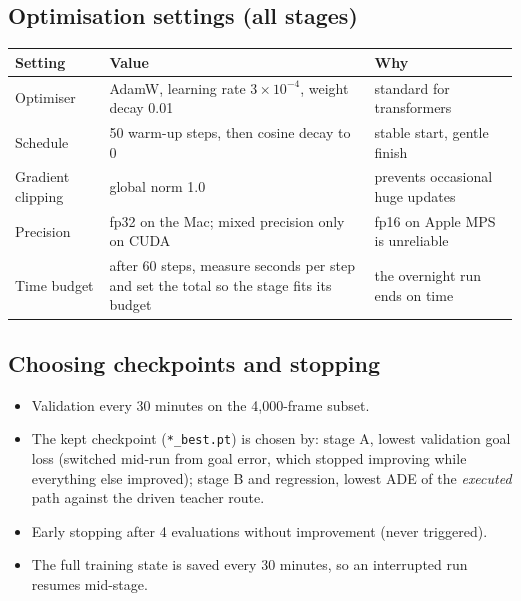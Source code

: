 \documentclass[11pt,a4paper]{article}
\newcommand{\code}[1]{\texttt{#1}}
\begin{document}
\subsection{Optimisation settings (all stages)}
\begin{table}[h]
\small
\begin{tabularx}{\linewidth}{@{}lLL@{}}
\toprule
Setting & Value & Why \\
\midrule
Optimiser & AdamW, learning rate $3\times10^{-4}$, weight decay 0.01 & standard for transformers \\
Schedule & 50 warm-up steps, then cosine decay to 0 & stable start, gentle finish \\
Gradient clipping & global norm 1.0 & prevents occasional huge updates \\
Precision & fp32 on the Mac; mixed precision only on CUDA & fp16 on Apple MPS is unreliable \\
Time budget & after 60 steps, measure seconds per step and set the total so the stage fits its budget & the overnight run ends on time \\
\bottomrule
\end{tabularx}
\end{table}

\subsection{Choosing checkpoints and stopping}
\begin{itemize}[nosep]
  \item Validation every 30 minutes on the 4{,}000-frame subset.
  \item The kept checkpoint (\code{*\_best.pt}) is chosen by: stage A, lowest validation goal loss (switched
        mid-run from goal error, which stopped improving while everything else improved); stage B and
        regression, lowest ADE of the \emph{executed} path against the driven teacher route.
  \item Early stopping after 4 evaluations without improvement (never triggered).
  \item The full training state is saved every 30 minutes, so an interrupted run resumes mid-stage.
\end{itemize}
\end{document}
